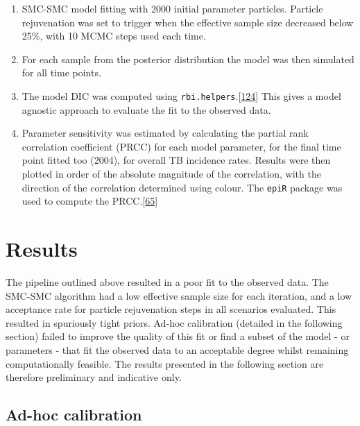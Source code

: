 \documentclass[11pt,twoside]{bristolthesis}
\begin{document}
\begin{enumerate}
  \item
    SMC-SMC model fitting with 2000 initial parameter particles. Particle rejuvenation was set to trigger when the effective sample size decreased below 25\%, with 10 MCMC steps used each time.
  \item
    For each sample from the posterior distribution the model was then simulated for all time points.
  \item
    The model DIC was computed using \texttt{rbi.helpers}.{[}\protect\hyperlink{ref-Funk:2019uw}{124}{]} This gives a model agnostic approach to evaluate the fit to the observed data.
  \item
    Parameter sensitivity was estimated by calculating the partial rank correlation coefficient (PRCC) for each model parameter, for the final time point fitted too (2004), for overall TB incidence rates. Results were then plotted in order of the absolute magnitude of the correlation, with the direction of the correlation determined using colour. The \texttt{epiR} package was used to compute the PRCC.{[}\protect\hyperlink{ref-EpiR}{65}{]}
  \end{enumerate}
  \hypertarget{results-3}{%
  \section{Results}\label{results-3}}
  
  The pipeline outlined above resulted in a poor fit to the observed data. The SMC-SMC algorithm had a low effective sample size for each iteration, and a low acceptance rate for particle rejuvenation steps in all scenarios evaluated. This resulted in spuriously tight priors. Ad-hoc calibration (detailed in the following section) failed to improve the quality of this fit or find a subset of the model - or parameters - that fit the observed data to an acceptable degree whilst remaining computationally feasible. The results presented in the following section are therefore preliminary and indicative only.
  
  \hypertarget{ad-hoc-calibration}{%
  \subsection{Ad-hoc calibration}\label{ad-hoc-calibration}}
  
\end{document}
